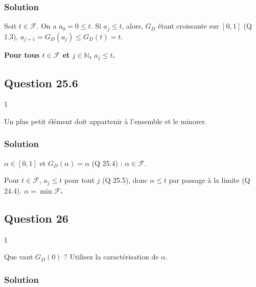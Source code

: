 \documentclass[11pt,a4paper]{article}
\begin{document}
\hypertarget{solution-59}{%
\subsubsection{Solution}\label{solution-59}}

Soit \(t\in\mathcal F\). On a \(a_0=0\le t\). Si \(a_j\le t\), alors, \(G_D\) étant croissante sur \([0,1]\) (Q 1.3), \(a_{j+1}=G_D(a_j)\le G_D(t)=t\).

\textbf{Pour tous \(t\in\mathcal F\) et \(j\in\mathbb N\), \(a_j\le t\).}

\hypertarget{question-25.6}{%
\subsection{Question 25.6}\label{question-25.6}}

\begin{indication}{1}

Un plus petit élément doit appartenir à l'ensemble et le minorer.

\end{indication}

\hypertarget{solution-60}{%
\subsubsection{Solution}\label{solution-60}}

\(\alpha\in[0,1]\) et \(G_D(\alpha)=\alpha\) (Q 25.4) : \(\alpha\in\mathcal F\).

Pour \(t\in\mathcal F\), \(a_j\le t\) pour tout \(j\) (Q 25.5), donc \(\alpha\le t\) par passage à la limite (Q 24.4). \textbf{\(\alpha=\min\mathcal F\).}

\hypertarget{question-26}{%
\subsection{Question 26}\label{question-26}}

\begin{indication}{1}

Que vaut \(G_D(0)\) ? Utilisez la caractérisation de \(\alpha\).

\end{indication}

\hypertarget{solution-61}{%
\subsubsection{Solution}\label{solution-61}}
\end{document}
